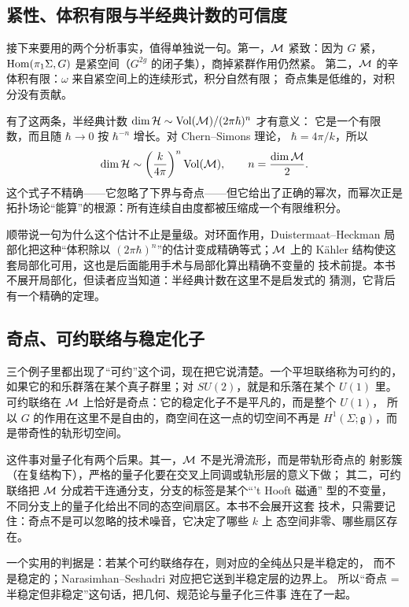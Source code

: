 \subsection{紧性、体积有限与半经典计数的可信度}

接下来要用的两个分析事实，值得单独说一句。第一，$\mathcal{M}$ 紧致：因为 $G$ 紧，
$\operatorname{Hom}(\pi_1\Sigma,G)$ 是紧空间（$G^{2g}$ 的闭子集），商掉紧群作用仍然紧。
第二，$\mathcal{M}$ 的辛体积有限：$\omega$ 来自紧空间上的连续形式，积分自然有限；
奇点集是低维的，对积分没有贡献。

有了这两条，半经典计数 $\dim\mathcal{H}\sim\mathrm{Vol}(\mathcal{M})/(2\pi\hbar)^{n}$ 才有意义：
它是一个有限数，而且随 $\hbar\to0$ 按 $\hbar^{-n}$ 增长。对 Chern--Simons 理论，
$\hbar=4\pi/k$，所以
\[
\dim\mathcal{H}\sim\left(\frac{k}{4\pi}\right)^{n}\mathrm{Vol}(\mathcal{M}),\qquad n=\frac{\dim\mathcal{M}}{2}.
\]
这个式子不精确——它忽略了下界与奇点——但它给出了正确的幂次，而幂次正是
拓扑场论“能算”的根源：所有连续自由度都被压缩成一个有限维积分。

顺带说一句为什么这个估计不止是量级。对环面作用，Duistermaat--Heckman
局部化把这种“体积除以 $(2\pi\hbar)^n$”的估计变成精确等式；$\mathcal{M}$ 上的
Kähler 结构使这套局部化可用，这也是后面能用手术与局部化算出精确不变量的
技术前提。本书不展开局部化，但读者应当知道：半经典计数在这里不是启发式的
猜测，它背后有一个精确的定理。

\subsection{奇点、可约联络与稳定化子}

三个例子里都出现了“可约”这个词，现在把它说清楚。一个平坦联络称为可约的，
如果它的和乐群落在某个真子群里；对 $SU(2)$，就是和乐落在某个 $U(1)$ 里。
可约联络在 $\mathcal{M}$ 上恰好是奇点：它的稳定化子不是平凡的，而是整个 $U(1)$，
所以 $G$ 的作用在这里不是自由的，商空间在这一点的切空间不再是
$H^1(\Sigma;\mathfrak g)$，而是带奇性的轨形切空间。

这件事对量子化有两个后果。其一，$\mathcal{M}$ 不是光滑流形，而是带轨形奇点的
射影簇（在复结构下），严格的量子化要在交叉上同调或轨形层的意义下做；
其二，可约联络把 $\mathcal{M}$ 分成若干连通分支，分支的标签是某个“’t Hooft 磁通”
型的不变量，不同分支上的量子化给出不同的态空间扇区。本书不会展开这套
技术，只需要记住：奇点不是可以忽略的技术噪音，它决定了哪些 $k$ 上
态空间非零、哪些扇区存在。

一个实用的判据是：若某个可约联络存在，则对应的全纯丛只是半稳定的，
而不是稳定的；Narasimhan--Seshadri 对应把它送到半稳定层的边界上。
所以“奇点 = 半稳定但非稳定”这句话，把几何、规范论与量子化三件事
连在了一起。

